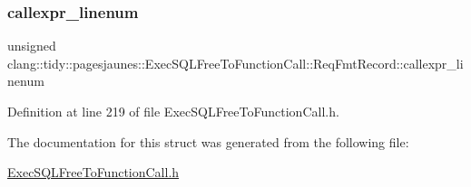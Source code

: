 \subsubsection{\texorpdfstring{callexpr\+\_\+linenum}{callexpr\_linenum}}
{\footnotesize\ttfamily unsigned clang\+::tidy\+::pagesjaunes\+::\+Exec\+S\+Q\+L\+Free\+To\+Function\+Call\+::\+Req\+Fmt\+Record\+::callexpr\+\_\+linenum}



Definition at line 219 of file Exec\+S\+Q\+L\+Free\+To\+Function\+Call.\+h.



The documentation for this struct was generated from the following file\+:\begin{DoxyCompactItemize}
\item 
\hyperlink{_exec_s_q_l_free_to_function_call_8h}{Exec\+S\+Q\+L\+Free\+To\+Function\+Call.\+h}\end{DoxyCompactItemize}
